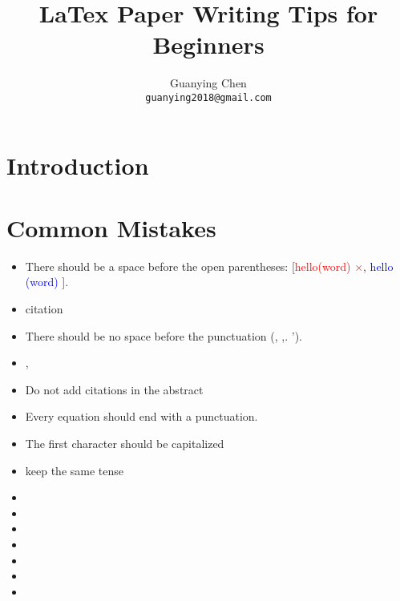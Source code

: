 \documentclass[10pt,twocolumn,letterpaper]{article}
\newcommand{\correct}[1]{\textcolor{blue}{#1 \checkmark}}
\newcommand{\wrong}[1]{\textcolor{red}{#1 $\times$}}
\begin{document}
\title{LaTex Paper Writing Tips for Beginners}

\author{Guanying Chen \\
{\tt\small guanying2018@gmail.com}
}
\maketitle
{
    \hypersetup{linkcolor=black}
    \tableofcontents
}



\vspace{6em}
\section{Introduction}
\label{sec:intro}

\section{Common Mistakes}
\begin{itemize}
    \item There should be a space before the open parentheses: [\wrong{hello(word)}, \correct{hello (word)}].
    \item citation
    \item There should be no space before the punctuation (\eg, ,. ').
    \item \ie, \eg
    \item Do not add citations in the abstract
    \item Every equation should end with a punctuation.
    \item The first character should be capitalized
    \item keep the same tense
    \item
    \item
    \item
    \item
    \item
    \item
    \item
\end{itemize}
\end{document}
